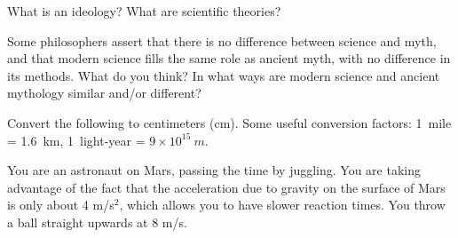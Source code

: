 \documentclass[12pt]{exam}
\begin{document}
\clearpage
\begin{questions}

\question What is an ideology? What are scientific theories?
	\fillwithlines{2in}	
	
\question
Some philosophers assert that there is no difference between science and myth, and that modern science fills the same role as ancient myth, with no difference in its methods. What do you think? In what ways are modern science and ancient mythology similar and/or different?
\fillwithlines{3in}

\question
	Convert the following to centimeters (cm). Some useful conversion factors: 1~mile = 1.6~km, 1~light-year = $9\times 10^{15}~m$.

\clearpage
\question
You are an astronaut on Mars, passing the time by juggling. You are taking advantage of the fact that the acceleration due to gravity on the surface of Mars is only about 4 m/s$^2$, which allows you to have slower reaction times. You throw a ball straight upwards at 8 m/s.
\end{questions}
\end{document}
